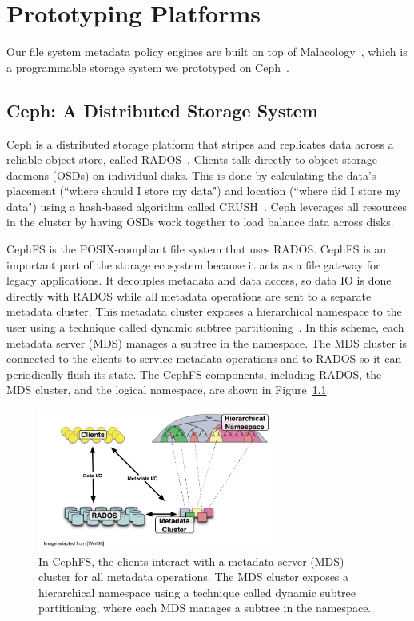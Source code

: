 \chapter{Prototyping Platforms}
\label{chp:prototyping-platform}

Our file system metadata policy engines are built on top of
Malacology~\cite{sevilla:eurosys17-malacology}, which is a programmable storage
system we prototyped on Ceph~\cite{weil:osdi2006-ceph}.

\section{Ceph: A Distributed Storage System}

Ceph is a distributed storage platform that stripes and replicates data across
a reliable object store, called RADOS~\cite{weil_rados_2007}. Clients talk
directly to object storage daemons (OSDs) on individual disks. This is done by
calculating the data's placement (``where should I store my data") and location
(``where did I store my data") using a hash-based algorithm called
CRUSH~\cite{weil_crush_2006}. Ceph leverages all resources in the cluster by
having OSDs work together to load balance data across disks.

CephFS is the POSIX-compliant file system that uses RADOS. CephFS is an
important part of the storage ecosystem because it acts as a file gateway for
legacy applications. It decouples metadata and data access, so data IO is done
directly with RADOS while all metadata operations are sent to a separate metadata
cluster. This metadata cluster exposes a hierarchical namespace to the user
using a technique called dynamic subtree
partitioning~\cite{weil:sc2004-dyn-metadata}. In this scheme, each metadata
server (MDS) manages a subtree in the namespace. The MDS cluster is connected
to the clients to service metadata operations and to RADOS so it can
periodically flush its state. The CephFS components, including RADOS, the MDS
cluster, and the logical namespace, are shown in Figure~\ref{ceph-arch}. 

\begin{figure}[t]
\centering
	\includegraphics[width=0.7\textwidth]{./chapters/advancement/figures/ceph-arch.png} 

	\caption{In CephFS, the clients interact with a metadata server (MDS)
        cluster for all metadata operations. The MDS cluster exposes a hierarchical
        namespace using a technique called dynamic subtree partitioning, where each MDS
        manages a subtree in the namespace.\label{ceph-arch}}

\end{figure}

